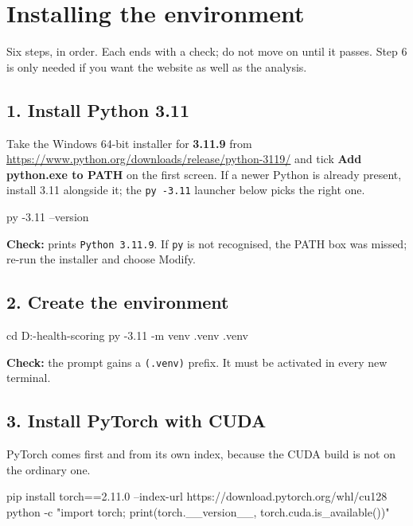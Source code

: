 
\section{Installing the environment}
\label{sec:install}

Six steps, in order. Each ends with a check; do not move on until it passes. Step 6 is only needed
if you want the website as well as the analysis.

\subsection*{1. Install Python 3.11}

Take the Windows 64-bit installer for \textbf{3.11.9} from
\url{https://www.python.org/downloads/release/python-3119/} and tick \textbf{Add python.exe to
PATH} on the first screen. If a newer Python is already present, install 3.11 alongside it; the
\texttt{py -3.11} launcher below picks the right one.

\begin{cmd}
py -3.11 --version
\end{cmd}

\noindent \textbf{Check:} prints \texttt{Python 3.11.9}. If \texttt{py} is not recognised, the PATH
box was missed; re-run the installer and choose Modify.

\subsection*{2. Create the environment}

\begin{cmd}
cd D:\ea-health-scoring
py -3.11 -m venv .venv
.venv\Scripts\activate
\end{cmd}

\noindent \textbf{Check:} the prompt gains a \texttt{(.venv)} prefix. It must be activated in every
new terminal.

\subsection*{3. Install PyTorch with CUDA}

PyTorch comes first and from its own index, because the CUDA build is not on the ordinary one.

\begin{cmd}
pip install torch==2.11.0 --index-url https://download.pytorch.org/whl/cu128
python -c "import torch; print(torch.__version__, torch.cuda.is_available())"
\end{cmd}

